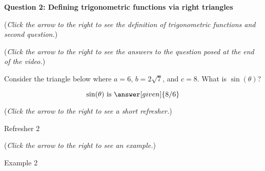 \documentclass{ximera}
\begin{document}
\textbf{Question 2: Defining trigonometric functions via right triangles}
\begin{question}
\begin{flushright}
{\color{blue}(\emph{Click the arrow to the right to see the definition
of trigonometric functions and second question.})}
\end{flushright}
\begin{center}
\begin{expandable}
{\color{blue}(\emph{Click the arrow to the right to see the answers 
to the question posed at the end of the video.})}
\begin{expandable}
Consider the triangle below where $a = 6$, $b=2\sqrt{7}$,
and $c=8$. What is $\sin( \theta)$?\\
\begin{prompt}
\[
\sin(\theta)\text{ is }\answer[given]{8/6}
\]
\end{prompt}
\begin{flushright}
{\color{blue}(\emph{Click the arrow to the right to see a short refresher.})}
\end{flushright}
\begin{expandable}
Refresher 2
\end{expandable}
\begin{flushright}
{\color{blue}(\emph{Click the arrow to the right to see an example.})}
\end{flushright}
\begin{expandable}
Example 2
\end{expandable}
\end{expandable}
\end{expandable}
\end{center}
\end{question}
\end{document}
